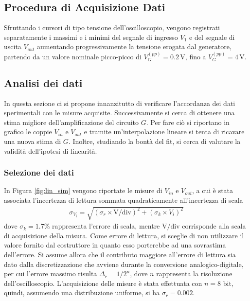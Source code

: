 \documentclass[a4paper,11pt]{article}
\begin{document}
\subsection{Procedura di Acquisizione Dati }
Sfruttando i cursori di tipo tensione dell'oscilloscopio, vengono registrati separatamente
i massimi e i minimi del segnale di ingresso $V_{1}$ e del segnale di uscita $V_{out}$
aumentando progressivamente la tensione erogata dal generatore, partendo da un valore nominale
picco-picco di $V_{G}^{(pp)}=0.2 \, \si{\volt}$, fino a $V_{G}^{(pp)}=4 \, \si{\volt}$.

\subsection{Analisi dei dati}
In questa sezione ci si propone innanzitutto di verificare l'accordanza dei dati sperimentali
con le misure acquisite. Successivamente si cerca di ottenere una stima migliore
dell'amplificazione del circuito $G$. Per fare ciò si riportano in grafico le coppie $V_{in}$ e
$V_{out}$ e tramite un'interpolazione lineare si tenta di ricavare una nuova stima di $G$.
Inoltre, studiando la bontà del fit, si cerca di valutare la validità dell'ipotesi di linearità.

\subsubsection{Selezione dei dati}
In Figura \ref{fig:lin_sim} vengono riportate le misure di $V_{in}$ e $V_{out}$, a cui è stata
associata l'incertezza di lettura sommata quadraticamente all'incertezza di scala
\begin{align}\label{e:err_misure}
  \sigma_{V_{i}}= \sqrt{ \left(\sigma_{r} \times \si{\volt} / \text{div} \right)^{2} +
  \left( \sigma_{k} \times V_{i} \right)^{2}}
\end{align}
dove $\sigma_{k} = 1.7\%$ rappresenta l'errore di scala, mentre $\si{\volt}/ \text{div}$
corrisponde alla scala di acquisizione della misura. Come errore di lettura, si sceglie
di non utilizzare il valore fornito dal costruttore in quanto esso porterebbe ad
una sovrastima dell'errore. Si assume allora che il contributo maggiore all'errore di
lettura sia dato dalla discretizzazione che avviene durante la conversione analogico-digitale, per
cui l'errore massimo risulta $\Delta_{r}= 1 / 2^{n}$, dove $n$ rappresenta la risoluzione
dell'oscilloscopio. L'acquisizione delle misure è stata effettuata con $n=8 \text{ bit}$,
quindi, assumendo una distribuzione uniforme, si ha $\sigma_{r} = 0.002$.
\end{document}

